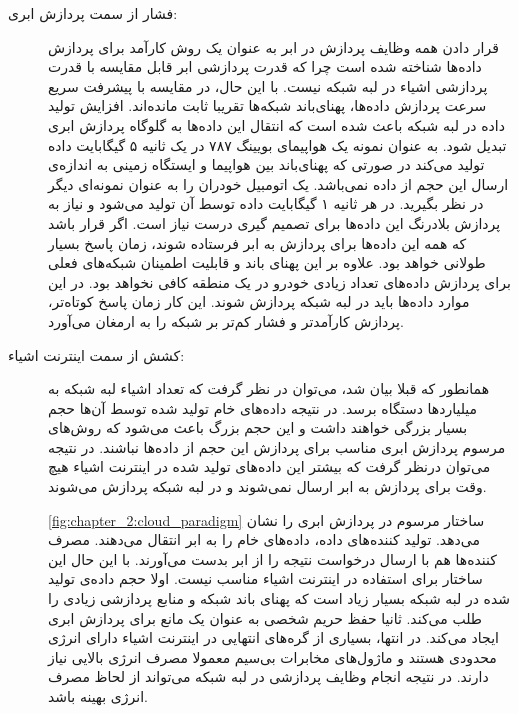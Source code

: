       \begin{description}
        \item [فشار از سمت پردازش ابری:]
          قرار دادن همه وظایف پردازش در ابر به عنوان یک روش کارآمد برای پردازش داده‌ها شناخته شده است چرا که قدرت پردازشی ابر قابل مقایسه با قدرت پردازشی اشیاء در لبه شبکه نیست.
          با این حال، در مقایسه با پیشرفت سریع سرعت پردازش داده‌ها، پهنای‌باند شبکه‌ها تقریبا ثابت مانده‌اند.
          افزایش تولید داده در لبه شبکه باعث شده است که انتقال این داده‌ها به گلوگاه پردازش ابری تبدیل شود.
          به عنوان نمونه یک هواپیما‌ی بویینگ ۷۸۷ در یک ثانیه ۵ گیگابایت داده تولید می‌کند در صورتی که پهنای‌باند بین هواپیما و ایستگاه زمینی به اندازه‌ی ارسال این حجم از داده نمی‌باشد.
          یک اتومبیل خودران را به عنوان نمونه‌ای دیگر در نظر بگیرید.
          در هر ثانیه ۱ گیگابایت داده توسط آن تولید می‌شود و نیاز به پردازش بلادرنگ این داده‌ها برای تصمیم گیری درست نیاز است.
          اگر قرار باشد که همه این داده‌ها برای پردازش به ابر فرستاده شوند، زمان پاسخ بسیار طولانی خواهد بود.
          علاوه بر این پهنای باند و قابلیت اطمینان شبکه‌های فعلی برای پردازش داده‌‌های تعداد زیادی خودرو در یک منطقه کافی نخواهد بود.
          در این موارد داده‌ها باید در لبه شبکه پردازش شوند.
          این کار زمان پاسخ کوتاه‌تر، پردازش کارآمد‌تر و فشار کم‌تر بر شبکه را به ارمغان می‌آورد.

        \item [کشش از سمت اینترنت اشیاء:]
          همانطور که قبلا بیان شد، می‌توان در نظر گرفت که تعداد اشیاء لبه شبکه به میلیارد‌ها دستگاه برسد.
          در نتیجه داده‌های خام تولید شده توسط آن‌ها حجم بسیار بزرگی خواهند داشت و این حجم بزرگ باعث می‌شود که روش‌های مرسوم پردازش ابری مناسب برای پردازش این حجم از داده‌ها نباشند.
          در نتیجه می‌توان درنظر گرفت که بیشتر این داده‌های تولید شده در اینترنت اشیاء هیچ وقت برای پردازش به ابر ارسال نمی‌شوند و در لبه شبکه پردازش می‌شوند.

          \cref{fig:chapter_2:cloud_paradigm} ساختار مرسوم در پردازش ابری را نشان می‌دهد.
          تولید کننده‌های داده، داده‌های خام را به ابر انتقال می‌دهند.
          مصرف کننده‌ها هم با ارسال درخواست نتیجه را از ابر بدست می‌آورند.
          با این حال این ساختار برای استفاده در اینترنت اشیاء مناسب نیست.
          اولا حجم داده‌ی تولید شده در لبه شبکه بسیار زیاد است که پهنای باند شبکه و منابع پردازشی زیادی را طلب می‌کند.
          ثانیا حفظ حریم شخصی به عنوان یک مانع برای پردازش ابری ایجاد می‌کند.
          در انتها، بسیاری از گره‌های انتهایی در اینترنت اشیاء دارای انرژی محدودی هستند و ماژول‌های مخابرات بی‌سیم معمولا مصرف انرژی بالایی نیاز دارند.
          در نتیجه انجام وظایف پردازشی در لبه شبکه می‌تواند از لحاظ مصرف انرژی بهینه‌ باشد.


\end{description}

